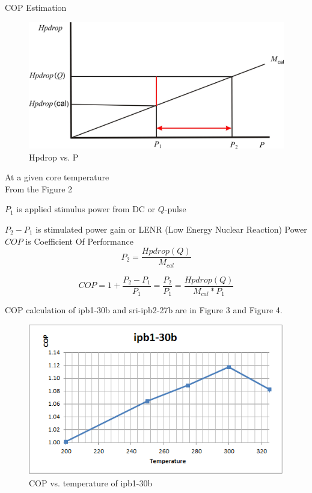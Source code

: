 \documentclass{article}
\begin{document}
COP Estimation\\
\begin{figure}
[h]
\begin{center}
\includegraphics[scale=0.5]{jin3.JPG} 
\caption{Hpdrop vs. P}%
\end{center}
\end{figure}

At a given core temperature\\

From the Figure 2

$P_{1}$ is applied stimulus power from DC or $Q$-pulse

$P_{2}-P_{1}$ is stimulated power gain or LENR (Low Energy Nuclear Reaction) Power \\

$COP$ is Coefficient Of Performance\\
\begin{equation}
P_{2} = \frac{Hpdrop(Q)}{M_{cal}}
\end{equation}

\begin{equation}
COP=1+\frac{P_{2}-P_{1}}{P_{1}}=\frac{P_{2}}{P_{1}}=\frac{Hpdrop(Q)}{M_{cal}*P_{1}} \label{4}%
\end{equation}


COP calculation of ipb1-30b and sri-ipb2-27b are in Figure 3 and Figure 4.
\begin{figure}
[h]
\includegraphics[scale=1.0]{ipb-30b.png} 
\caption{COP vs. temperature of ipb1-30b}%
\end{figure}
\end{document}
